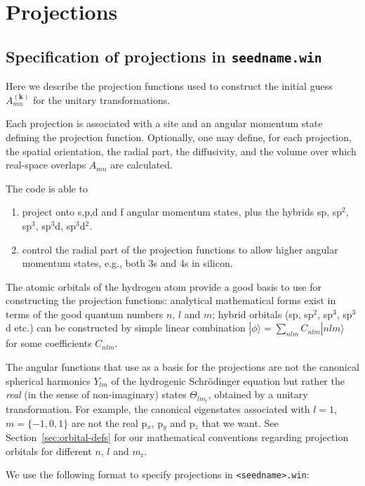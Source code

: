 \chapter{Projections}\label{ch:proj}

\section{Specification of projections in {\tt seedname.win}}
\label{sec:proj}
Here we describe the projection functions used to construct the
initial guess $A_{mn}^{(\mathbf{k})}$ for the unitary transformations.

Each projection is associated with a site and an angular momentum
state defining the projection function. Optionally, one may define,
for each projection, the spatial orientation, the radial part, the
diffusivity, and the volume over which real-space overlaps $A_{mn}$
are calculated.

The code is able to
\begin{enumerate}
\item project onto s,p,d and f
 angular momentum states, plus the hybrids sp, sp$^2$, sp$^3$, sp$^3$d,
 sp$^3$d$^2$.
\item control the radial part of the projection functions
  to allow higher angular momentum states, e.g., both 3s and 4s in
  silicon.
\end{enumerate}

The atomic orbitals of the hydrogen atom provide a good
basis to use for constructing the projection functions: analytical
mathematical forms exist in terms of the good quantum numbers $n$, $l$
and $m$; hybrid orbitals (sp, sp$^{2}$, sp$^{3}$, sp$^{3}$d etc.) 
can be constructed by simple linear combination $|\phi\rangle =
\sum_{nlm} C_{nlm}|nlm\rangle$ for some coefficients
$C_{nlm}$. 

The angular functions that use as a basis for the
projections are not the canonical spherical harmonics $Y_{lm}$ of the
hydrogenic Schr\"{o}dinger equation but rather the
\textit{real} (in the sense of non-imaginary) states
$\Theta_{lm_{\mathrm{r}}}$, obtained by a unitary
transformation. For example, the canonical
eigenstates associated with $l=1$, $m=\{-1,0,1\}$ are not 
the real p$_{x}$, p$_{y}$ and p$_{z}$
that we want. See Section~\ref{sec:orbital-defs} for our mathematical
conventions regarding projection orbitals for different $n$, $l$ and
$m_{\mathrm{r}}$.
 
We use the following format to specify projections in
\verb#<seedname>.win#:

